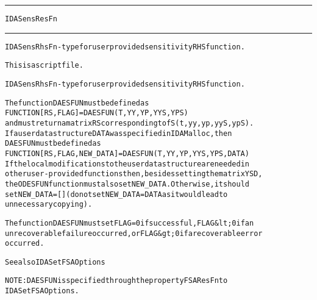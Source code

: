 \begin{samepage}
\hrule
\begin{center}
{\large \verb!IDASensResFn!}
\label{p:IDASensResFn}
\end{center}
\hrule\vspace{0.1in}



\begin{alltt}
IDASensRhsFn - type for user provided sensitivity RHS function.
\end{alltt}

\end{samepage}



\begin{samepage}


\begin{alltt}
This is a script file. 
\end{alltt}

\end{samepage}



\begin{alltt}
IDASensRhsFn - type for user provided sensitivity RHS function.

   The function DAESFUN must be defined as 
        FUNCTION [RS, FLAG] = DAESFUN(T,YY,YP,YYS,YPS)
   and must return a matrix RS corresponding to fS(t,yy,yp,yyS,ypS).
   If a user data structure DATA was specified in IDAMalloc, then
   DAESFUN must be defined as
        FUNCTION [RS, FLAG, NEW_DATA] = DAESFUN(T,YY,YP,YYS,YPS,DATA)
   If the local modifications to the user data structure are needed in
   other user-provided functions then, besides setting the matrix YSD,
   the ODESFUN function must also set NEW_DATA. Otherwise, it should
   set NEW_DATA=[] (do not set NEW_DATA = DATA as it would lead to 
   unnecessary copying).

   The function DAESFUN must set FLAG=0 if successful, FLAG&lt;0 if an
   unrecoverable failure occurred, or FLAG&gt;0 if a recoverable error
   occurred.

   See also IDASetFSAOptions

   NOTE: DAESFUN is specified through the property FSAResFn to
         IDASetFSAOptions.
\end{alltt}






\vspace{0.1in}